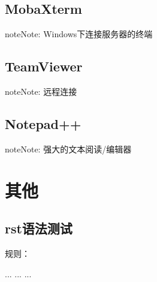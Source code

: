 \documentclass[letterpaper,10pt,english]{sphinxmanual}
\begin{document}


\section{MobaXterm}
\label{\detokenize{softwares/index:mobaxterm}}
\begin{sphinxadmonition}{note}{Note:}
Windows下连接服务器的终端
\end{sphinxadmonition}



\section{TeamViewer}
\label{\detokenize{softwares/index:teamviewer}}
\begin{sphinxadmonition}{note}{Note:}
远程连接
\end{sphinxadmonition}



\section{Notepad++}
\label{\detokenize{softwares/index:notepad}}
\begin{sphinxadmonition}{note}{Note:}
强大的文本阅读/编辑器
\end{sphinxadmonition}



\chapter{其他}
\label{\detokenize{else/index::doc}}\label{\detokenize{else/index:id1}}

\section{rst语法测试}
\label{\detokenize{else/01_test_code:rst}}\label{\detokenize{else/01_test_code::doc}}
 规则：

%
\begin{sphinxVerbatim}[commandchars=\\\{\}]
  ...
    ...
    ...
\end{sphinxVerbatim}
\end{document}
